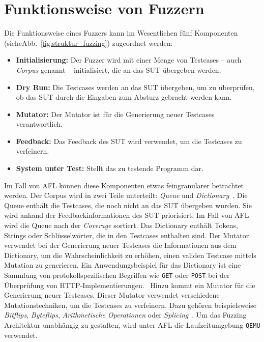 \section{Funktionsweise von Fuzzern}\label{sec:funktionsweise}
Die Funktionsweise eines Fuzzers kann im Wesentlichen fünf Komponenten (sieheAbb.~\ref{fig:struktur_fuzzing}) zugeordnet werden:
\begin{itemize}
    \item \textbf{Initialisierung:} Der Fuzzer wird mit einer Menge von Testcases -- auch \textit{Corpus} genannt -- initialisiert, die an das SUT übergeben werden.
    \item \textbf{Dry Run:} Die Testcases werden an das SUT übergeben, um zu überprüfen, ob das SUT durch die Eingaben zum
        Absturz gebracht werden kann.
    \item \textbf{Mutator:} Der Mutator ist für die Generierung neuer Testcases verantwortlich.
    \item \textbf{Feedback:} Das Feedback des SUT wird verwendet, um die Testcases zu verfeinern.
    \item \textbf{System unter Test:} Stellt das zu testende Programm dar.
\end{itemize}
Im Fall von AFL können diese Komponenten etwas feingranularer betrachtet werden.
Der Corpus wird in zwei Teile unterteilt: \textit{Queue} und \textit{Dictionary}~\cite{afl_whitepaper}.
Die Queue enthält die Testcases, die noch nicht an das SUT übergeben wurden.
Sie wird anhand der Feedbackinformationen des SUT priorisiert.
Im Fall von AFL wird die Queue nach der \textit{Coverage} sortiert.
Das Dictionary enthält Tokens, Strings oder Schlüsselwörter, die in den Testcases enthalten sind.
Der Mutator verwendet bei der Generierung neuer Testcases die Informationen aus dem Dictionary, um die Wahrscheinlichkeit
zu erhöhen, einen validen Testcase mittels Mutation zu generieren.
Ein Anwendungsbeispiel für das Dictionary ist eine Sammlung von protokollspezifischen Begriffen wie \texttt{GET} oder
\texttt{POST} bei der Überprüfung von HTTP-Implementierungen.~\newline
Hinzu kommt ein Mutator für die Generierung neuer Testcases.
Dieser Mutator verwendet verschiedene Mutationstechniken, um die Testcases zu verfeinern.
Dazu gehören beispielsweise \textit{Bitflips}, \textit{Byteflips}, \textit{Arithmetische Operationen} oder
\textit{Splicing}~\cite{afl_whitepaper}.\newline
Um das Fuzzing Architektur unabhängig zu gestalten, wird unter AFL die Laufzeitumgebung \texttt{QEMU} verwendet.
